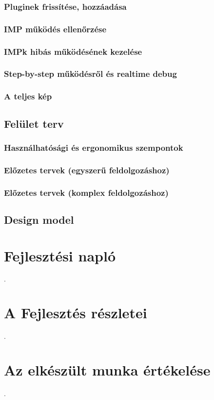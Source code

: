 \documentclass[a4paper,12pt,oneside]{report}
\begin{document}
\subsubsection{Pluginek frissítése, hozzáadása}
\subsubsection{IMP működés ellenőrzése}
\subsubsection{IMPk hibás működésének kezelése}
\subsubsection{Step-by-step működésről és realtime debug}
\subsubsection{A teljes kép}

\subsection{Felület terv}
\subsubsection{Használhatósági és ergonomikus szempontok}
\subsubsection{Előzetes tervek (egyszerű feldolgozáshoz)}
\subsubsection{Előzetes tervek (komplex feldolgozáshoz)}


\subsection{Design model}


\section{Fejlesztési napló}
.
\section{A Fejlesztés részletei}
.
\section{Az elkészült munka értékelése}
.
\end{document}
